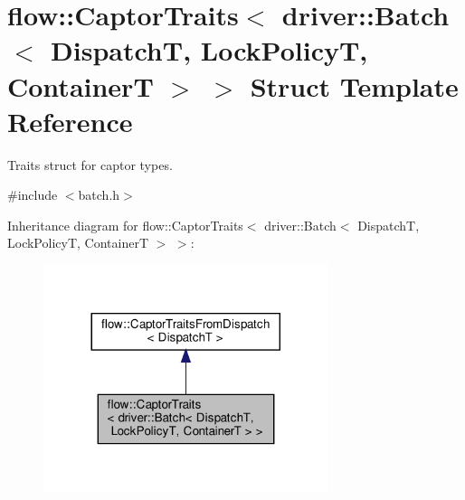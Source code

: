 \hypertarget{structflow_1_1_captor_traits_3_01driver_1_1_batch_3_01_dispatch_t_00_01_lock_policy_t_00_01_container_t_01_4_01_4}{}\section{flow\+:\+:Captor\+Traits$<$ driver\+:\+:Batch$<$ DispatchT, Lock\+PolicyT, ContainerT $>$ $>$ Struct Template Reference}
\label{structflow_1_1_captor_traits_3_01driver_1_1_batch_3_01_dispatch_t_00_01_lock_policy_t_00_01_container_t_01_4_01_4}


Traits struct for captor types.  




{\ttfamily \#include $<$batch.\+h$>$}



Inheritance diagram for flow\+:\+:Captor\+Traits$<$ driver\+:\+:Batch$<$ DispatchT, Lock\+PolicyT, ContainerT $>$ $>$\+:\nopagebreak
\begin{figure}[H]
\begin{center}
\leavevmode
\includegraphics[width=236pt]{structflow_1_1_captor_traits_3_01driver_1_1_batch_3_01_dispatch_t_00_01_lock_policy_t_00_01_conta2660d5fdeed71557319522ab1bb531c}
\end{center}
\end{figure}


